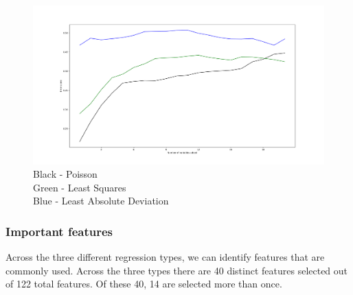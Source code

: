 \documentclass{article}
\begin{document}
\begin{figure}[H]
\begin{center}\includegraphics[scale=0.4]{example}\end{center}\caption{Black - Poisson\\Green - Least Squares\\Blue - Least Absolute Deviation}\label{fig:f1}
\end{figure}

\pagebreak\subsubsection*{Important features}

Across the three different regression types, we can identify features that are commonly used. Across the three types there are 40 distinct features selected out of 122 total features. Of these 40, 14 are selected more than once.
\end{document}
